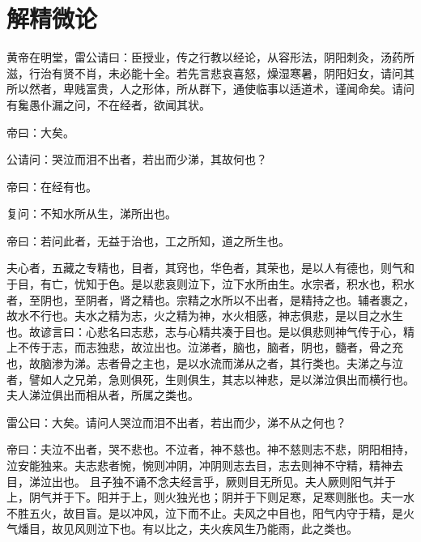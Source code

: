 \documentclass{article}%
\begin{document}
\section{解精微论}
黄帝在明堂，雷公请曰：臣授业，传之行教以经论，从容形法，阴阳刺灸，汤药所滋，行治有贤不肖，未必能十全。若先言悲哀喜怒，燥湿寒暑，阴阳妇女，请问其所以然者，卑贱富贵，人之形体，所从群下，通使临事以适道术，谨闻命矣。请问有毚愚仆漏之问，不在经者，欲闻其状。

帝曰：大矣。

公请问：哭泣而泪不出者，若出而少涕，其故何也？

帝曰：在经有也。

复问：不知水所从生，涕所出也。

帝曰：若问此者，无益于治也，工之所知，道之所生也。

夫心者，五藏之专精也，目者，其窍也，华色者，其荣也，是以人有德也，则气和于目，有亡，忧知于色。是以悲哀则泣下，泣下水所由生。水宗者，积水也，积水者，至阴也，至阴者，肾之精也。宗精之水所以不出者，是精持之也。辅者裹之，故水不行也。夫水之精为志，火之精为神，水火相感，神志俱悲，是以目之水生也。故谚言曰：心悲名曰志悲，志与心精共凑于目也。是以俱悲则神气传于心，精上不传于志，而志独悲，故泣出也。泣涕者，脑也，脑者，阴也，髓者，骨之充也，故脑渗为涕。志者骨之主也，是以水流而涕从之者，其行类也。夫涕之与泣者，譬如人之兄弟，急则俱死，生则俱生，其志以神悲，是以涕泣俱出而横行也。夫人涕泣俱出而相从者，所属之类也。

雷公曰：大矣。请问人哭泣而泪不出者，若出而少，涕不从之何也？

帝曰：夫泣不出者，哭不悲也。不泣者，神不慈也。神不慈则志不悲，阴阳相持，泣安能独来。夫志悲者惋，惋则冲阴，冲阴则志去目，志去则神不守精，精神去目，涕泣出也。 且子独不诵不念夫经言乎，厥则目无所见。夫人厥则阳气并于上，阴气并于下。阳并于上，则火独光也；阴并于下则足寒，足寒则胀也。夫一水不胜五火，故目盲。是以冲风，泣下而不止。夫风之中目也，阳气内守于精，是火气燔目，故见风则泣下也。有以比之，夫火疾风生乃能雨，此之类也。


\end{document}
